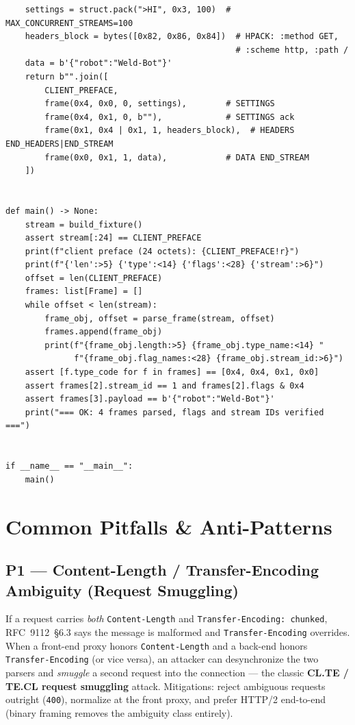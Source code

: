 \begin{verbatim}
    settings = struct.pack(">HI", 0x3, 100)  # MAX_CONCURRENT_STREAMS=100
    headers_block = bytes([0x82, 0x86, 0x84])  # HPACK: :method GET,
                                               # :scheme http, :path /
    data = b'{"robot":"Weld-Bot"}'
    return b"".join([
        CLIENT_PREFACE,
        frame(0x4, 0x0, 0, settings),        # SETTINGS
        frame(0x4, 0x1, 0, b""),             # SETTINGS ack
        frame(0x1, 0x4 | 0x1, 1, headers_block),  # HEADERS END_HEADERS|END_STREAM
        frame(0x0, 0x1, 1, data),            # DATA END_STREAM
    ])


def main() -> None:
    stream = build_fixture()
    assert stream[:24] == CLIENT_PREFACE
    print(f"client preface (24 octets): {CLIENT_PREFACE!r}")
    print(f"{'len':>5} {'type':<14} {'flags':<28} {'stream':>6}")
    offset = len(CLIENT_PREFACE)
    frames: list[Frame] = []
    while offset < len(stream):
        frame_obj, offset = parse_frame(stream, offset)
        frames.append(frame_obj)
        print(f"{frame_obj.length:>5} {frame_obj.type_name:<14} "
              f"{frame_obj.flag_names:<28} {frame_obj.stream_id:>6}")
    assert [f.type_code for f in frames] == [0x4, 0x4, 0x1, 0x0]
    assert frames[2].stream_id == 1 and frames[2].flags & 0x4
    assert frames[3].payload == b'{"robot":"Weld-Bot"}'
    print("=== OK: 4 frames parsed, flags and stream IDs verified ===")


if __name__ == "__main__":
    main()
\end{verbatim}

\section{Common Pitfalls \& Anti-Patterns}
\label{sec:pitfalls}

\subsection*{P1 --- Content-Length / Transfer-Encoding Ambiguity (Request Smuggling)}

\begin{warningbox}
If a request carries \emph{both} \texttt{Content-Length} and \texttt{Transfer-Encoding: chunked}, RFC~9112~\S6.3 says the message is malformed and \texttt{Transfer-Encoding} overrides. When a front-end proxy honors \texttt{Content-Length} and a back-end honors \texttt{Transfer-Encoding} (or vice versa), an attacker can desynchronize the two parsers and \emph{smuggle} a second request into the connection --- the classic \textbf{CL.TE / TE.CL request smuggling} attack. Mitigations: reject ambiguous requests outright (\texttt{400}), normalize at the front proxy, and prefer HTTP/2 end-to-end (binary framing removes the ambiguity class entirely).
\end{warningbox}

